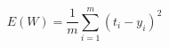 \begin{equation}
    E(W) = \frac{1}{m} \sum_{i=1}^{m} (t_i - y_i)^2
    \label{eq:MSE}
\end{equation}
